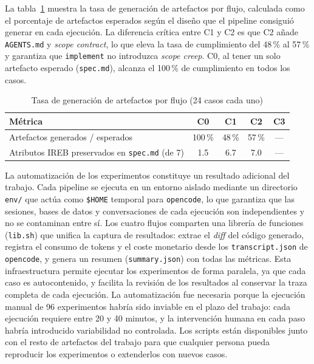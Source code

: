 La tabla~\ref{tab:artefactos-flujos} muestra la tasa de generaci\'on de artefactos por flujo, calculada como el porcentaje de artefactos esperados seg\'un el dise\~no que el pipeline consigui\'o generar en cada ejecuci\'on. La diferencia cr\'itica entre C1 y C2 es que C2 a\~nade \texttt{AGENTS.md} y \emph{scope contract}, lo que eleva la tasa de cumplimiento del 48\,\% al 57\,\% y garantiza que \texttt{implement} no introduzca \emph{scope creep}. C0, al tener un solo artefacto esperado (\texttt{spec.md}), alcanza el 100\,\% de cumplimiento en todos los casos.

\begin{table}[htbp]
\centering
\caption{Tasa de generaci\'on de artefactos por flujo (24 casos cada uno)}
\label{tab:artefactos-flujos}
\begin{tabular}{lcccc}
\toprule
\textbf{M\'etrica} & \textbf{C0} & \textbf{C1} & \textbf{C2} & \textbf{C3} \\
\midrule
Artefactos generados / esperados & 100\,\% & 48\,\% & 57\,\% & --- \\
Atributos IREB preservados en \texttt{spec.md} (de 7) & 1.5 & 6.7 & 7.0 & --- \\
\midrule
\end{tabular}
\end{table}

La automatizaci\'on de los experimentos constituye un resultado adicional del trabajo. Cada pipeline se ejecuta en un entorno aislado mediante un directorio \texttt{env/} que act\'ua como \texttt{\$HOME} temporal para \texttt{opencode}, lo que garantiza que las sesiones, bases de datos y conversaciones de cada ejecuci\'on son independientes y no se contaminan entre s\'i. Los cuatro flujos comparten una librer\'ia de funciones (\texttt{lib.sh}) que unifica la captura de resultados: extrae el \emph{diff} del c\'odigo generado, registra el consumo de tokens y el coste monetario desde los \texttt{transcript.json} de \texttt{opencode}, y genera un resumen (\texttt{summary.json}) con todas las m\'etricas. Esta infraestructura permite ejecutar los experimentos de forma paralela, ya que cada caso es autocontenido, y facilita la revisi\'on de los resultados al conservar la traza completa de cada ejecuci\'on. La automatizaci\'on fue necesaria porque la ejecuci\'on manual de 96 experimentos habr\'ia sido inviable en el plazo del trabajo: cada ejecuci\'on requiere entre 20 y 40 minutos, y la intervenci\'on humana en cada paso habr\'ia introducido variabilidad no controlada. Los scripts est\'an disponibles junto con el resto de artefactos del trabajo para que cualquier persona pueda reproducir los experimentos o extenderlos con nuevos casos.
